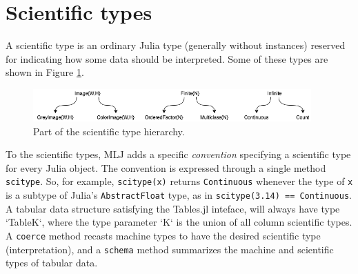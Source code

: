 \documentclass{article}
\begin{document}
\section{Scientific types}

A scientific type is an ordinary Julia type (generally without
instances) reserved for indicating how some data should be
interpreted. Some of these types are shown in Figure \ref{fig:fig1}.

\begin{figure}
  \centering
  \includegraphics[width=0.95\textwidth]{scitypesII}
  \caption{Part of the scientific type hierarchy.}
  \label{fig:fig1}
\end{figure}

To the scientific types, MLJ adds a specific \textit{convention}
specifying a scientific type for every Julia object. The convention is
expressed through a single method \texttt{scitype}.  So, for example,
\texttt{scitype(x)} returns \texttt{Continuous} whenever the type of
\texttt{x} is a subtype of Julia's \texttt{AbstractFloat} type, as in
\texttt{scitype(3.14) == Continuous}. A tabular data structure
satisfying the Tables.jl inteface, will always have type `Table{K}`,
where the type parameter `K` is the union of all column scientific
types. A \texttt{coerce} method recasts machine types to have the
desired scientific type (interpretation), and a \texttt{schema} method
summarizes the machine and scientific types of tabular data.





\end{document}
